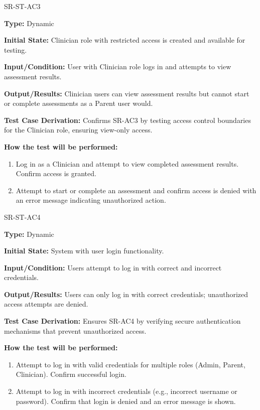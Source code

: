 \documentclass[12pt, titlepage]{article}
\begin{document}
\begin{itemize}
  \begin{item}
    SR-ST-AC3
      \begin{mdframed}[linewidth=0.5mm]
        \textbf{Type:} Dynamic \par
        \textbf{Initial State:} Clinician role with restricted access is created and available for testing. \par
        \textbf{Input/Condition:} User with Clinician role logs in and attempts to view assessment results. \par
        \textbf{Output/Results:} Clinician users can view assessment results but cannot start or 
        complete assessments as a Parent user would. \par
        \textbf{Test Case Derivation:} Confirms SR-AC3 by testing access control boundaries for the Clinician role, ensuring view-only access. \par
        \textbf{How the test will be performed:}
        \begin{enumerate}[noitemsep]
          \item Log in as a Clinician and attempt to view completed assessment results. Confirm access is granted.
          \item Attempt to start or complete an assessment and confirm access is denied with an 
          error message indicating unauthorized action.
        \end{enumerate}
      \end{mdframed}
  \end{item}

  \begin{item}
     SR-ST-AC4
    \begin{mdframed}[linewidth=0.5mm]
      \textbf{Type:} Dynamic \par
      \textbf{Initial State:} System with user login functionality. \par
      \textbf{Input/Condition:} Users attempt to log in with correct and incorrect credentials. \par
      \textbf{Output/Results:} Users can only log in with correct credentials; unauthorized access attempts are denied. \par
      \textbf{Test Case Derivation:} Ensures SR-AC4 by verifying secure authentication mechanisms that prevent unauthorized access. \par
      \textbf{How the test will be performed:}
      \begin{enumerate}[noitemsep]
        \item Attempt to log in with valid credentials for multiple roles (Admin, Parent, Clinician). Confirm successful login.
        \item Attempt to log in with incorrect credentials (e.g., incorrect username or password). 
        Confirm that login is denied and an error message is shown.
      \end{enumerate}
    \end{mdframed}
  \end{item}


\end{itemize}
\end{document}

